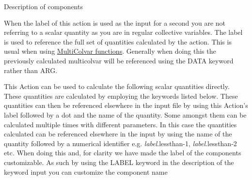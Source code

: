 \begin{DoxyParagraph}{Description of components}

\end{DoxyParagraph}
When the label of this action is used as the input for a second you are not referring to a scalar quantity as you are in regular collective variables. The label is used to reference the full set of quantities calculated by the action. This is usual when using \hyperlink{mcolv_multicolvarfunction}{Multi\+Colvar functions}. Generally when doing this the previously calculated multicolvar will be referenced using the D\+A\+T\+A keyword rather than A\+R\+G.

This Action can be used to calculate the following scalar quantities directly. These quantities are calculated by employing the keywords listed below. These quantities can then be referenced elsewhere in the input file by using this Action's label followed by a dot and the name of the quantity. Some amongst them can be calculated multiple times with different parameters. In this case the quantities calculated can be referenced elsewhere in the input by using the name of the quantity followed by a numerical identifier e.\+g. {\itshape label}.lessthan-\/1, {\itshape label}.lessthan-\/2 etc. When doing this and, for clarity we have made the label of the components customizable. As such by using the L\+A\+B\+E\+L keyword in the description of the keyword input you can customize the component name

